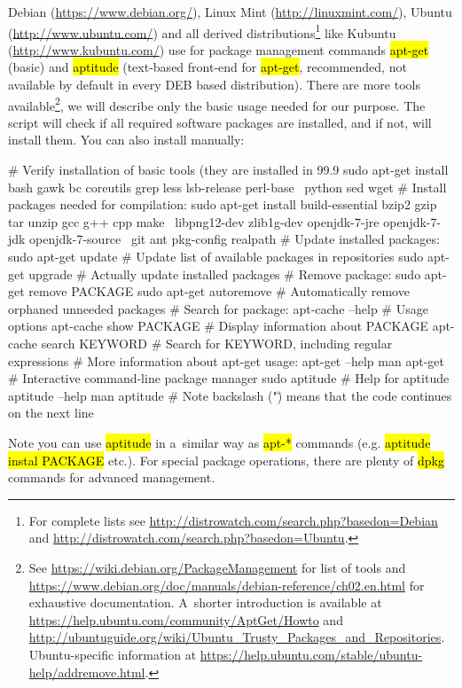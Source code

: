 \documentclass[a4paper, 11pt, twoside]{article}
\renewcommand{\texttt}[1]{\hl{\ttfamily #1}}
\begin{document}
Debian (\url{https://www.debian.org/}), Linux Mint (\url{http://linuxmint.com/}), Ubuntu (\url{http://www.ubuntu.com/}) and all derived distributions\footnote{For complete lists see \url{http://distrowatch.com/search.php?basedon=Debian} and \url{http://distrowatch.com/search.php?basedon=Ubuntu}.} like Kubuntu (\url{http://www.kubuntu.com/}) use for package management commands \texttt{apt-get} (basic) and \texttt{aptitude} (text-based front-end for \texttt{apt-get}, recommended, not available by default in every DEB based distribution). There are more tools available\footnote{See \url{https://wiki.debian.org/PackageManagement} for list of tools and \url{https://www.debian.org/doc/manuals/debian-reference/ch02.en.html} for exhaustive documentation. A~shorter introduction is available at \url{https://help.ubuntu.com/community/AptGet/Howto} and \url{http://ubuntuguide.org/wiki/Ubuntu_Trusty_Packages_and_Repositories}. Ubuntu-specific information at \url{https://help.ubuntu.com/stable/ubuntu-help/addremove.html}.}, we will describe only the basic usage needed for our purpose. The script will check if all required software packages are installed, and if not, will install them. You can also install manually:

\begin{bashcode}
  # Verify installation of basic tools (they are installed in 99.9%
  sudo apt-get install bash gawk bc coreutils grep less lsb-release perl-base \
    python sed wget
  # Install packages needed for compilation:
  sudo apt-get install build-essential bzip2 gzip tar unzip gcc g++ cpp make \
    libpng12-dev zlib1g-dev openjdk-7-jre openjdk-7-jdk openjdk-7-source \
    git ant pkg-config realpath
  # Update installed packages:
  sudo apt-get update # Update list of available packages in repositories
  sudo apt-get upgrade # Actually update installed packages
  # Remove package:
  sudo apt-get remove PACKAGE
  sudo apt-get autoremove # Automatically remove orphaned unneeded packages
  # Search for package:
  apt-cache --help # Usage options
  apt-cache show PACKAGE # Display information about PACKAGE
  apt-cache search KEYWORD # Search for KEYWORD, including regular expressions
  # More information about apt-get usage:
  apt-get --help
  man apt-get
  # Interactive command-line package manager
  sudo aptitude
  # Help for aptitude
  aptitude --help
  man aptitude
  # Note backslash ("\") means that the code continues on the next line
\end{bashcode}

Note you can use \texttt{aptitude} in a~similar way as \texttt{apt-*} commands (e.g. \texttt{aptitude instal PACKAGE} etc.). For special package operations, there are plenty of \texttt{dpkg} commands for advanced management.
\end{document}
